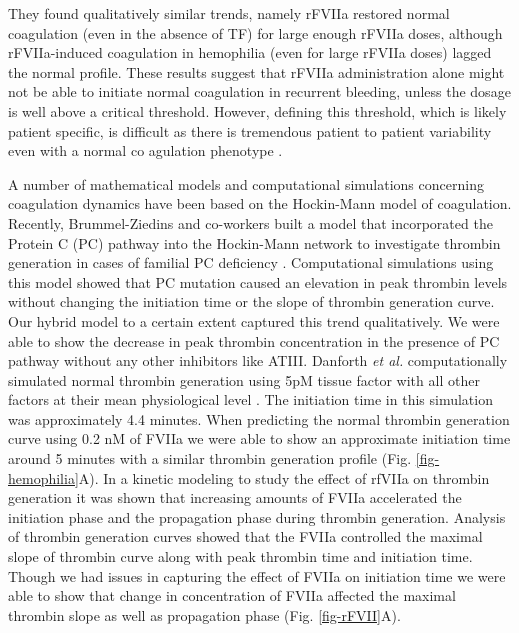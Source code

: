 \documentclass[processes,article,received,moreauthors,pdftex,12pt,a4paper]{mdpi}
\begin{document}
They found qualitatively similar trends, namely rFVIIa restored normal coagulation (even in the absence of TF) for large enough rFVIIa doses, although rFVIIa-induced coagulation 
in hemophilia (even for large rFVIIa doses) lagged the normal profile. 
These results suggest that rFVIIa administration alone
might not be able to initiate normal coagulation in recurrent bleeding, unless the dosage is well above a critical threshold.
However, defining this threshold, which is likely patient specific, is difficult as there is tremendous patient to patient variability even with a normal
co agulation phenotype \citep{Danforth:2012aa}. 

A number of mathematical models and computational simulations concerning coagulation dynamics have been based on the Hockin-Mann model of coagulation. Recently, Brummel-Ziedins and co-workers built a model that incorporated the Protein C (PC) pathway into the Hockin-Mann network to investigate thrombin generation in cases of familial PC deficiency \cite{BrummelPC:2012}. Computational simulations using this model showed that PC mutation caused an elevation in peak thrombin levels without changing the initiation time or the slope of thrombin generation curve. Our hybrid model to a certain extent captured this trend qualitatively. We were able to show the decrease in peak thrombin concentration in the presence of PC pathway without any other inhibitors like ATIII. Danforth \emph{et al.} computationally simulated normal thrombin generation using 5pM tissue factor with all other factors at their mean physiological level \citep{Danforth:2012aa}. The initiation time in this simulation was approximately 4.4 minutes. When predicting the normal thrombin generation curve using 0.2 nM of FVIIa we were able to show an approximate initiation time around 5 minutes with a similar thrombin generation profile (Fig. \ref{fig-hemophilia}A).  In a kinetic modeling to study the effect of rfVIIa on thrombin generation \cite{Mitrophanov:2011} it was shown that increasing amounts of FVIIa accelerated the initiation phase and the propagation phase during thrombin generation. Analysis of thrombin generation curves showed that the FVIIa controlled the maximal slope of thrombin curve along with peak thrombin time and initiation time. Though we had issues in capturing the effect of FVIIa on initiation time we were able to show that change in concentration of FVIIa affected the maximal thrombin slope as well as propagation phase (Fig. \ref{fig-rFVII}A). 
\end{document}
